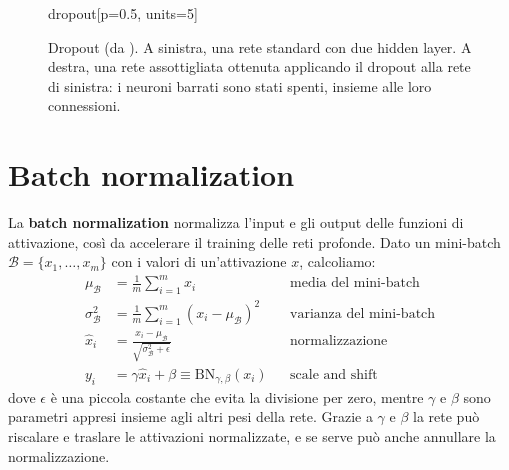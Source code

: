 \begin{figure}[htbp]
\centering
\begin{widget}{dropout}[p=0.5, units=5]
\end{widget}
\caption{Dropout (da \cite{Srivastava2014}). A sinistra, una rete standard con due hidden layer. A destra, una rete assottigliata ottenuta applicando il dropout alla rete di sinistra: i neuroni barrati sono stati spenti, insieme alle loro connessioni.}
\label{fig:dropout}
\end{figure}

\section{Batch normalization}
La \textbf{batch normalization} \cite{Ioffe2015} normalizza l'input e gli output delle funzioni di attivazione, così da accelerare il training delle reti profonde. Dato un mini-batch $\mathcal{B} = \{x_1, \dots, x_m\}$ con i valori di un'attivazione $x$, calcoliamo:
\begin{align*}
\mu_\mathcal{B} &= \frac{1}{m}\sum_{i=1}^m x_i && \text{media del mini-batch} \\
\sigma_\mathcal{B}^2 &= \frac{1}{m}\sum_{i=1}^m (x_i - \mu_\mathcal{B})^2 && \text{varianza del mini-batch} \\
\hat{x}_i &= \frac{x_i - \mu_\mathcal{B}}{\sqrt{\sigma_\mathcal{B}^2 + \epsilon}} && \text{normalizzazione} \\
y_i &= \gamma \hat{x}_i + \beta \equiv \mathrm{BN}_{\gamma, \beta}(x_i) && \text{scale and shift}
\end{align*}
dove $\epsilon$ è una piccola costante che evita la divisione per zero, mentre $\gamma$ e $\beta$ sono parametri appresi insieme agli altri pesi della rete. Grazie a $\gamma$ e $\beta$ la rete può riscalare e traslare le attivazioni normalizzate, e se serve può anche annullare la normalizzazione.

